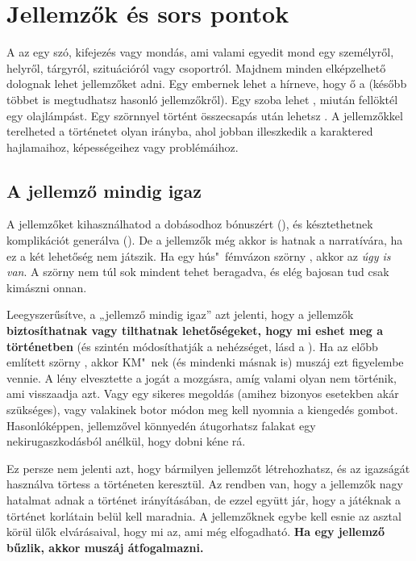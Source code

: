 \chapter{Jellemzők és sors pontok}

A  az egy szó, kifejezés vagy mondás, ami valami egyedit mond egy személyről, helyről, tárgyról, szituációról vagy csoportról. Majdnem minden elképzelhető dolognak lehet jellemzőket adni. Egy embernek lehet a hírneve, hogy ő a  (később többet is megtudhatsz hasonló jellemzőkről). Egy szoba lehet , miután fellöktél egy olajlámpást. Egy szörnnyel történt összecsapás után lehetsz . A jellemzőkkel terelheted a történetet olyan irányba, ahol jobban illeszkedik a karaktered hajlamaihoz, képességeihez vagy problémáihoz.

\section{A jellemző mindig igaz}

A jellemzőket kihasználhatod a dobásodhoz bónuszért (), és késztethetnek komplikációt generálva (). De a jellemzők még akkor is hatnak a narratívára, ha ez a két lehetőség nem játszik. Ha egy hús"~fémvázon szörny , akkor az \emph{úgy is van}. A szörny nem túl sok mindent tehet beragadva, és elég bajosan tud csak kimászni onnan.

Leegyszerűsítve, a „jellemző mindig igaz” azt jelenti, hogy a jellemzők \textbf{biztosíthatnak vagy tilthatnak lehetőségeket, hogy mi eshet meg a történetben} (és szintén módosíthatják a nehézséget, lásd a ). Ha az előbb említett szörny , akkor KM"~nek (és mindenki másnak is) muszáj ezt figyelembe vennie. A lény elvesztette a jogát a mozgásra, amíg valami olyan nem történik, ami visszaadja azt. Vagy egy sikeres megoldás (amihez bizonyos esetekben akár  szükséges), vagy valakinek botor módon meg kell nyomnia a kiengedés gombot. Hasonlóképpen,  jellemzővel könnyedén átugorhatsz falakat egy nekirugaszkodásból anélkül, hogy dobni kéne rá.

Ez persze nem jelenti azt, hogy bármilyen jellemzőt létrehozhatsz, és az igazságát használva törtess a történeten keresztül. Az rendben van, hogy a jellemzők nagy hatalmat adnak a történet irányításában, de ezzel együtt jár, hogy a játéknak a történet korlátain belül kell maradnia. A jellemzőknek egybe kell esnie az asztal körül ülők elvárásaival, hogy mi az, ami még elfogadható. \textbf{Ha egy jellemző bűzlik, akkor muszáj átfogalmazni.}

